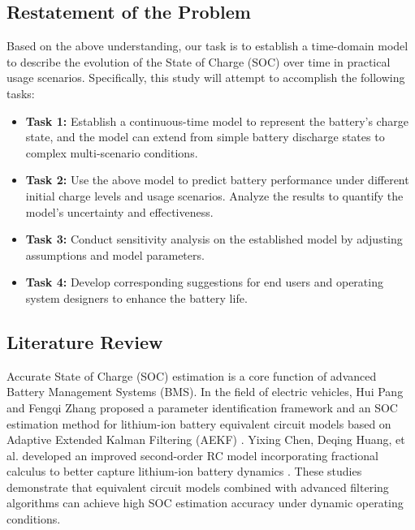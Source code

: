 \documentclass{mcmthesis}
\begin{document}
\subsection{Restatement of the Problem}
Based on the above understanding, our task is to establish a time-domain model to describe the evolution of the State of Charge (SOC) over time in practical usage scenarios. Specifically, this study will attempt to accomplish the following tasks:
\begin{itemize}
  \item \textbf{Task 1:} Establish a continuous-time model to represent the battery's charge state, and the model can extend from simple battery discharge states to complex multi-scenario conditions.
  \item \textbf{Task 2:} Use the above model to predict battery performance under different initial charge levels and usage scenarios.
                        Analyze the results to quantify the model's uncertainty and effectiveness. 
  \item \textbf{Task 3:} Conduct sensitivity analysis on the established model by adjusting assumptions and model parameters.
  \item \textbf{Task 4:} Develop corresponding suggestions for end users and operating system designers to enhance the battery life.
\end{itemize}
\subsection{Literature Review}
Accurate State of Charge (SOC) estimation is a core function of advanced Battery Management Systems (BMS). In the field of electric vehicles, Hui Pang and Fengqi Zhang proposed a parameter identification framework and an SOC estimation method for lithium-ion battery equivalent circuit models based on Adaptive Extended Kalman Filtering (AEKF) \cite{en11051033}. Yixing Chen, Deqing Huang, et al. developed an improved second-order RC model incorporating fractional calculus to better capture lithium-ion battery dynamics \cite{en10091313}. These studies demonstrate that equivalent circuit models combined with advanced filtering algorithms can achieve high SOC estimation accuracy under dynamic operating conditions.
\end{document}
